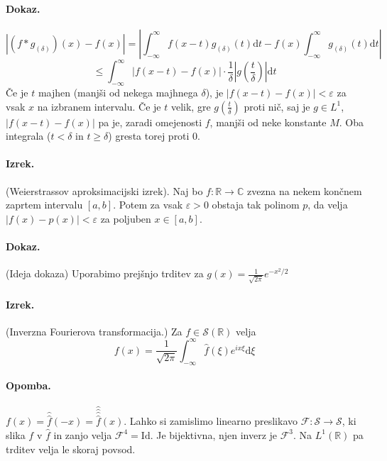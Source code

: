 \documentclass[a4paper]{article}
\newcommand{\dif}{\mathrm{d}}
\newcommand{\C}{\mathbb{C}}
\newcommand{\R}{\mathbb{R}}
\newcommand{\fn}[3]{{#1}\colon {#2} \rightarrow {#3}}
\newcommand{\Int}{\int_{-\infty}^{\infty}}
\begin{document}
\paragraph{Dokaz.} $$\left|(f * g_{(\delta)})(x) - f(x)\right| = \left|\Int f(x-t)g_{(\delta)}(t)\dif t - f(x)\Int g_{(\delta)}(t)\dif t\right|$$
$$\leq \Int |f(x-t) - f(x)| \cdot \frac{1}{\delta} |g\left(\frac{t}{\delta}\right)|\dif t$$
Če je $t$ majhen (manjši od nekega majhnega $\delta$), je $|f(x-t) - f(x)| < \varepsilon$ za vsak $x$ na izbranem intervalu. Če je $t$ velik, gre $\displaystyle{g\left(\frac{t}{\delta}\right)}$
proti nič, saj je $g \in L^1$, $|f(x-t) - f(x)|$ pa je, zaradi omejenosti $f$, manjši od neke konstante $M$. Oba integrala ($t < \delta$ in $t \geq \delta$) gresta torej proti 0.
\paragraph{Izrek.} (Weierstrassov aproksimacijski izrek). Naj bo $\fn{f}{\R}{\C}$ zvezna na nekem končnem zaprtem intervalu $[a, b]$. Potem za vsak $\varepsilon > 0$ obstaja tak polinom $p$,
da velja $|f(x) - p(x)| < \varepsilon$ za poljuben $x \in [a, b]$.
\paragraph{Dokaz.} (Ideja dokaza) Uporabimo prejšnjo trditev za $\displaystyle{g(x) = \frac{1}{\sqrt{2\pi}}}e^{-x^2/2}$
\paragraph{Izrek.} (Inverzna Fourierova transformacija.) Za $f \in \mathcal{S}(\R)$ velja $$f(x) = \frac{1}{\sqrt{2\pi}}\Int \hat{f}(\xi)e^{ix\xi}\dif \xi$$
\paragraph{Opomba.} $f(x) = \widehat{\widehat{f}}(-x) = \widehat{\widehat{\widehat{\widehat{f}}}}(x)$. Lahko si zamislimo linearno preslikavo $\fn{\mathcal{F}}{\mathcal{S}}{\mathcal{S}}$, ki slika $f$ v $\widehat{f}$ in zanjo velja
$\mathcal{F}^4 = \text{Id}$. Je bijektivna, njen inverz je $\mathcal{F}^3$. Na $L^1(\R)$ pa trditev velja le skoraj povsod.
\end{document}
